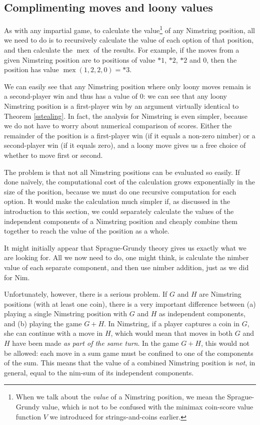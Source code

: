 \documentclass[a4paper,twocolumn]{article}
\DeclareMathOperator{\mex}{mex}
\begin{document}
\subsection{Complimenting moves and loony values}

As with any impartial game, to calculate the value\footnote{When we
  talk about the \emph{value} of a Nimstring position, we mean the
  Sprague-Grundy value, which is not to be confused with the minimax
  coin-score value function $V$ we introduced for strings-and-coins
  earlier.} of any Nimstring position, all we need to do is to
recursively calculate the value of each option of that position, and
then calculate the $\mex$ of the results. For example, if the moves
from a given Nimstring position are to positions of value $*1$, $*2$,
$*2$ and $0$, then the position has value $\mex(1, 2, 2, 0) = *3$.

We can easily see that any Nimstring position where only loony moves
remain is a second-player win and thus has a value of $0$: we can see
that any loony Nimstring position is a first-player win by an argument
virtually identical to Theorem \ref{sstealing}. In fact, the analysis
for Nimstring is even simpler, because we do not have to worry about
numerical comparison of scores. Either the remainder of the position
is a first-player win (if it equals a non-zero nimber) or a
second-player win (if it equals zero), and a loony move gives us a
free choice of whether to move first or second.

The problem is that not all Nimstring positions can be evaluated so
easily. If done na\"ively, the computational cost of the calculation
grows exponentially in the size of the position, because we must do
one recursive computation for each option. It would make the
calculation much simpler if, as discussed in the introduction to this
section, we could separately calculate the values of the independent
components of a Nimstring position and cheaply combine them together
to reach the value of the position as a whole.

It might initially appear that Sprague-Grundy theory gives us exactly
what we are looking for. All we now need to do, one might think, is
calculate the nimber value of each separate component, and then use
nimber addition, just as we did for Nim.

Unfortunately, however, there is a serious problem. If $G$ and $H$ are
Nimstring positions (with at least one coin), there is a very
important difference between (a) playing a single Nimstring position
with $G$ and $H$ as independent components, and (b) playing the game
$G+H$. In Nimstring, if a player captures a coin in $G$, she can
continue with a move in $H$, which would mean that moves in both $G$
and $H$ have been made \emph{as part of the same turn}. In the game
$G+H$, this would not be allowed: each move in a sum game must be
confined to one of the components of the sum. This means that the
value of a combined Nimstring position is \emph{not}, in general,
equal to the nim-sum of its independent components.
\end{document}
